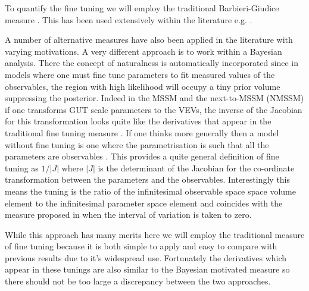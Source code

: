 \documentclass[preprint,amsmath,amssymb,aps,superscriptaddress,prd,showpacs,floatfix,nofootinbib]{revtex4-1}
\begin{document}
To quantify the fine tuning we will employ the traditional
Barbieri-Giudice measure \cite{Ellis:1986yg,Barbieri:1987fn}.  This
has been used extensively within the literature
e.g. \cite{deCarlos:1993yy, deCarlos:1993ca, Chankowski:1997zh,
  Agashe:1997kn, Wright:1998mk, Kane:1998im, BasteroGil:1999gu,
  Feng:1999zg, Allanach:2000ii, Dermisek:2005ar, Barbieri:2005kf,
  Allanach:2006jc, Gripaios:2006nn, Dermisek:2006py, Barbieri:2006dq,
  Kobayashi:2006fh, Perelstein:2012qg, Antusch:2012gv,Cheng:2012pe,
  CahillRowley:2012rv, Ross:2012nr, Basak:2012bd, Kang:2012sy,
  Athron:2013ipa,Miller:2013jra, Binjonaid:2014oga, Miller:2014jza}.

A number of alternative measures have also been applied in the
literature \cite{Anderson:1994dz, Anderson:1994tr, Anderson:1995cp,
  Anderson:1996ew, Ciafaloni:1996zh, Chan:1997bi, Barbieri:1998uv,
  Giusti:1998gz, Casas:2003jx, Casas:2004uu, Casas:2004gh,
  Casas:2006bd, Kitano:2005wc, Athron:2007ry, Athron:2007qr,
  Baer:2012up} with varying motivations.  A very different approach is
to work within a Bayesian analysis.  There the concept of naturalness
is automatically incorporated since in models where one must fine tune
parameters to fit measured values of the observables, the region with
high likelihood will occupy a tiny prior volume \cite{Allanach:2007qk,
  Cabrera:2008tj, Ghilencea:2012gz, Ghilencea:2012qk, Fichet:2012sn,
  Kim:2013uxa} suppressing the posterior.  Indeed in the MSSM and
the next-to-MSSM (NMSSM) if one transforms GUT scale parameters to the VEVs, the inverse
of the Jacobian for this transformation looks quite like the
derivatives that appear in the traditional fine tuning measure
\cite{Allanach:2007qk, Cabrera:2008tj, Kim:2013uxa}.  If one thinks
more generally then a model without fine tuning is one where the
parametrisation is such that all the parameters are observables
\cite{Fichet:2012sn, Kim:2013uxa}.  This provides a quite general
definition of fine tuning as $1/|J|$ where $|J|$ is the determinant of
the Jacobian for the co-ordinate transformation between the parameters
and the observables. Interestingly this means the tuning is the ratio
of the infinitesimal observable space space volume element to the
infinitesimal parameter space element and coincides with the measure
proposed in \cite{Athron:2007ry} when the interval of variation is
taken to zero.

While this approach has many merits here we will employ the traditional
measure of fine tuning because it is both simple to apply and easy to
compare with previous results due to it's widespread use.  Fortunately
the derivatives which appear in these tunings are also similar to the
Bayesian motivated measure so there should not be too large a
discrepancy between the two approaches.
\end{document}
